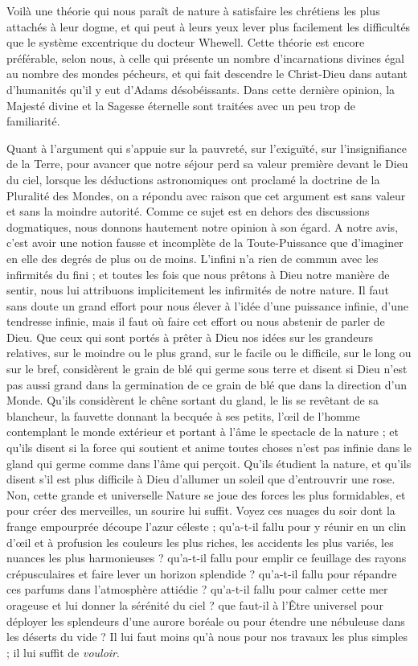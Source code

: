\documentclass[a4paper, 11pt, oneside, landscape]{article}
\begin{document}
Voilà une théorie qui nous paraît de nature à satisfaire les chrétiens les plus attachés à leur dogme, et qui peut à leurs yeux lever plus facilement les difficultés que le système excentrique du docteur Whewell. Cette théorie est encore préférable, selon nous, à celle qui présente un nombre d'incarnations divines égal au nombre des mondes pécheurs, et qui fait descendre le Christ-Dieu dans autant d'humanités qu'il y eut d'Adams désobéissants. Dans cette dernière opinion, la Majesté divine et la Sagesse éternelle sont traitées avec un peu trop de familiarité.

Quant à l'argument qui s'appuie sur la pauvreté, sur l'exiguïté, sur l'insignifiance de la Terre, pour avancer que notre séjour perd sa valeur première devant le Dieu du ciel, lorsque les déductions astronomiques ont proclamé la doctrine de la Pluralité des Mondes, on a répondu avec raison que cet argument est sans valeur et sans la moindre autorité. Comme ce sujet est en dehors des discussions dogmatiques, nous donnons hautement notre opinion à son égard. A notre avis, c'est avoir une notion fausse et incomplète de la Toute-Puissance que d'imaginer en elle des degrés de plus ou de moins. L'infini n'a rien de commun avec les infirmités du fini ; et toutes les fois que nous prêtons à Dieu notre manière de sentir, nous lui attribuons implicitement les infirmités de notre nature. Il faut sans doute un grand effort pour nous élever à l'idée d'une puissance infinie, d'une tendresse infinie, mais il faut où faire cet effort ou nous abstenir de parler de Dieu. Que ceux qui sont portés à prêter à Dieu nos idées sur les grandeurs relatives, sur le moindre ou le plus grand, sur le facile ou le difficile, sur le long ou sur le bref, considèrent le grain de blé qui germe sous terre et disent si Dieu n'est pas aussi grand dans la germination de ce grain de blé que dans la direction d'un Monde. Qu'ils considèrent le chêne sortant du gland, le lis se revêtant de sa blancheur, la fauvette donnant la becquée à ses petits, l'œil de l'homme contemplant le monde extérieur et portant à l'âme le spectacle de la nature ; et qu'ils disent si la force qui soutient et anime toutes choses n'est pas infinie dans le gland qui germe comme dans l'âme qui perçoit. Qu'ils étudient la nature, et qu'ils disent s'il est plus difficile à Dieu d'allumer un soleil que d'entrouvrir une rose. Non, cette grande et universelle Nature se joue des forces les plus formidables, et pour créer des merveilles, un sourire lui suffit. Voyez ces nuages du soir dont la frange empourprée découpe l'azur céleste ; qu'a-t-il fallu pour y réunir en un clin d'œil et à profusion les couleurs les plus riches, les accidents les plus variés, les nuances les plus harmonieuses ? qu'a-t-il fallu pour emplir ce feuillage des rayons crépusculaires et faire lever un horizon splendide ? qu'a-t-il fallu pour répandre ces parfums dans l'atmosphère attiédie ? qu'a-t-il fallu pour calmer cette mer orageuse et lui donner la sérénité du ciel ? que faut-il à l'Être universel pour déployer les splendeurs d'une aurore boréale ou pour étendre une nébuleuse dans les déserts du vide ? Il lui faut moins qu'à nous pour nos travaux les plus simples ; il lui suffit de \emph{vouloir}.
\end{document}
